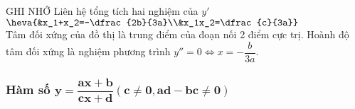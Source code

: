\vspace{0.4cm}
\begin{khung4}{GHI NHỚ}
	 Liên hệ tổng tích hai nghiệm của $y'$
	$\heva{&x_1+x_2=-\dfrac{2b}{3a}\\&x_1x_2=\dfrac{c}{3a}}$\\
	 Tâm đối xứng của đồ thị là trung điểm của đoạn nối 2 điểm cực trị. Hoành độ tâm đối xứng là nghiệm phương trình $y''=0 \Leftrightarrow x=-\dfrac{b}{3a}$.
\end{khung4}

\subsubsection{Hàm số $\bm{y =} \dfrac{{\bm{ax + b}}}{\bm{cx + d}} \bm{\left( {c \ne 0,ad - bc \ne 0} \right)}$}

